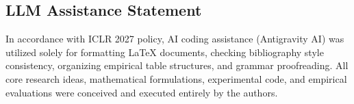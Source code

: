 \subsection*{LLM Assistance Statement}

In accordance with ICLR 2027 policy, AI coding assistance (Antigravity AI) was utilized solely for formatting LaTeX documents, checking bibliography style consistency, organizing empirical table structures, and grammar proofreading. All core research ideas, mathematical formulations, experimental code, and empirical evaluations were conceived and executed entirely by the authors.
